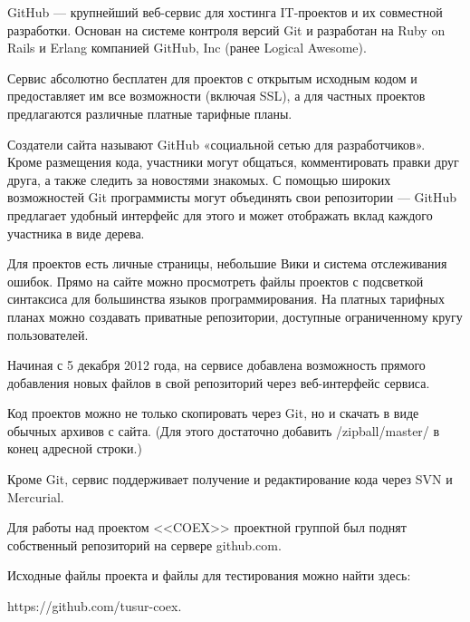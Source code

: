 GitHub ---  крупнейший веб-сервис для хостинга IT-проектов и их совместной разработки. Основан на системе контроля версий Git и разработан на Ruby on Rails и Erlang компанией GitHub, Inc (ранее Logical Awesome).

Сервис абсолютно бесплатен для проектов с открытым исходным кодом и предоставляет им все возможности (включая SSL), а для частных проектов предлагаются различные платные тарифные планы.\cite{github} 

Создатели сайта называют GitHub «социальной сетью для разработчиков». Кроме размещения кода, участники могут общаться, комментировать правки друг друга, а также следить за новостями знакомых. С помощью широких возможностей Git программисты могут объединять свои репозитории — GitHub предлагает удобный интерфейс для этого и может отображать вклад каждого участника в виде дерева.

Для проектов есть личные страницы, небольшие Вики и система отслеживания ошибок. Прямо на сайте можно просмотреть файлы проектов с подсветкой синтаксиса для большинства языков программирования. На платных тарифных планах можно создавать приватные репозитории, доступные ограниченному кругу пользователей.

Начиная с 5 декабря 2012 года, на сервисе добавлена возможность прямого добавления новых файлов в свой репозиторий через веб-интерфейс сервиса.

Код проектов можно не только скопировать через Git, но и скачать в виде обычных архивов с сайта. (Для этого достаточно добавить /zipball/master/ в конец адресной строки.)

Кроме Git, сервис поддерживает получение и редактирование кода через SVN и Mercurial.

Для работы над проектом <<COEX>> проектной группой был поднят собственный репозиторий на сервере github.com.

Исходные файлы проекта и файлы для тестирования можно найти здесь:

https://github.com/tusur-coex.
